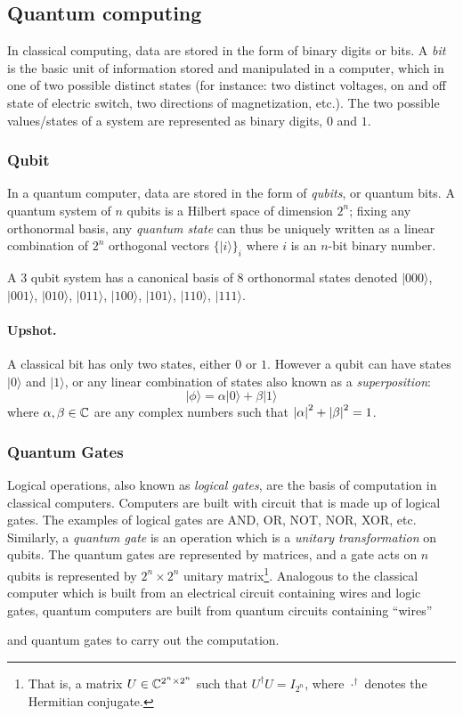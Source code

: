 \documentclass[11pt]{article}
\newcommand{\ket}[1]{|#1\rangle}
\newcommand{\adjoint}[1]{{#1}^{\dagger}} 			%
\begin{document}
\subsection{Quantum computing}

In classical computing, data are stored in the form of binary digits or bits. A \emph{bit} is the basic unit of information stored and manipulated in a computer, which in one of two possible distinct states (for instance: two distinct voltages, on and off state of electric switch, two directions of magnetization, etc.). 
The two possible values/states of a system are represented as binary digits, $0$ and $1$.

\subsubsection{Qubit}
In a quantum computer, data are stored in the form of \emph{qubits}, or quantum bits. A quantum system of $n$ qubits is a Hilbert space of dimension $2^n$; fixing any orthonormal basis, any \emph{quantum state} can thus be uniquely written as a linear combination of $2^n$ orthogonal vectors $\{\ket{i}\}_i$ where $i$ is an $n$-bit binary number.

\begin{example}A $3$ qubit system has a canonical basis of 8 orthonormal states denoted 
$\ket{000}$, $\ket{001}$, $\ket{010}$, $\ket{011}$, $\ket{100}$, $\ket{101}$, $\ket{110}$, $\ket{111}$.
\end{example}
\paragraph{Upshot.} A classical bit has only two states, either $0$ or $1$. However a qubit can have  states $\ket{0}$ and $\ket{1}$, or any linear combination of states also known as a \emph{superposition}: %
\[
	\ket{\phi}=\alpha\ket{0}+\beta\ket{1}
\]
where $\alpha,\beta\in\mathbb{C}$ are any complex numbers such that $\left\lvert \alpha \right\rvert^2+\left\lvert \beta \right\rvert^2=1$.

\subsubsection{Quantum Gates}
Logical operations, also known as \emph{logical gates}, are the basis of computation in classical computers. Computers are built with circuit that is made up of logical gates. The examples of logical gates are \textsf{AND}, \textsf{OR}, \textsf{NOT}, \textsf{NOR}, \textsf{XOR}, etc. Similarly,  a \emph{quantum gate} is an operation which is a \emph{unitary transformation} on qubits. The quantum gates are represented by matrices, and a gate acts on $n$ qubits is represented by $2^n \times 2^n$ unitary matrix\footnote{That is, a matrix $U\in\mathbb{C}^{2^n\times 2^n}$ such that $\adjoint{U}U=I_{2^n}$, where $\adjoint{\cdot}$ denotes the Hermitian conjugate.}. Analogous to the classical computer which is built from an electrical circuit containing wires and logic gates, quantum computers are built from  quantum circuits containing ``wires''  and quantum gates to carry out the computation.\medskip
\end{document}
